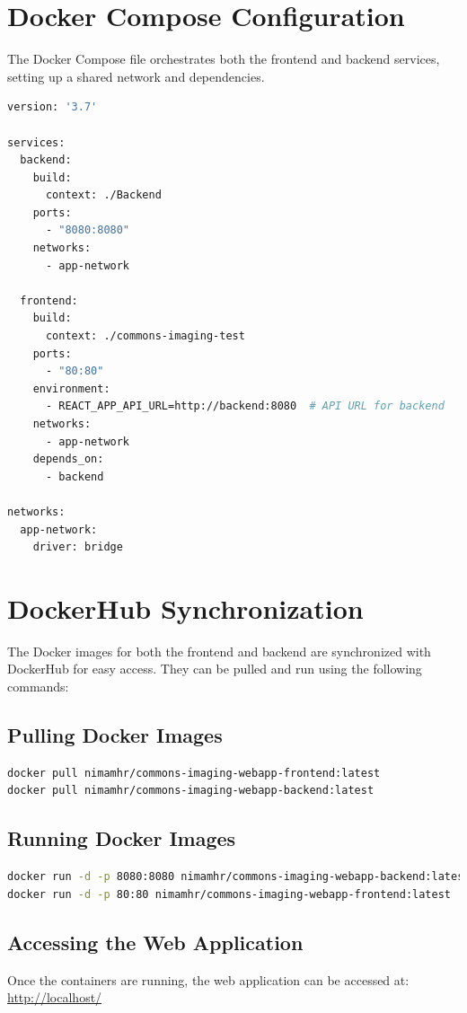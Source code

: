 \documentclass[a4paper,12pt]{report}
\begin{document}
\section{Docker Compose Configuration}
The Docker Compose file orchestrates both the frontend and backend services, setting up a shared network and dependencies.

\begin{lstlisting}[language=dockerfile, caption=Docker Compose File for Orchestration]
version: '3.7'

services:
  backend:
    build:
      context: ./Backend
    ports:
      - "8080:8080"
    networks:
      - app-network

  frontend:
    build:
      context: ./commons-imaging-test
    ports:
      - "80:80"
    environment:
      - REACT_APP_API_URL=http://backend:8080  # API URL for backend
    networks:
      - app-network
    depends_on:
      - backend

networks:
  app-network:
    driver: bridge
\end{lstlisting}

\section{DockerHub Synchronization}
The Docker images for both the frontend and backend are synchronized with DockerHub for easy access. They can be pulled and run using the following commands:
\newpage
\subsection{Pulling Docker Images}
\begin{lstlisting}[language=bash, caption=Pull Docker Images from DockerHub]
docker pull nimamhr/commons-imaging-webapp-frontend:latest
docker pull nimamhr/commons-imaging-webapp-backend:latest
\end{lstlisting}

\subsection{Running Docker Images}
\begin{lstlisting}[language=bash, caption=Run Docker Images]
docker run -d -p 8080:8080 nimamhr/commons-imaging-webapp-backend:latest
docker run -d -p 80:80 nimamhr/commons-imaging-webapp-frontend:latest
\end{lstlisting}

\subsection{Accessing the Web Application}
Once the containers are running, the web application can be accessed at:\\
\url{http://localhost/}
\end{document}

